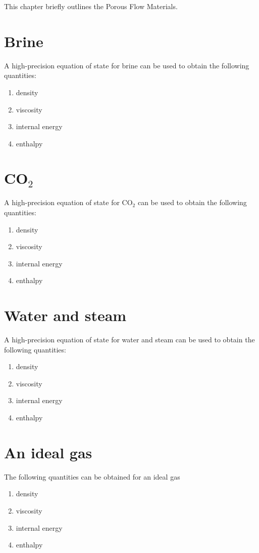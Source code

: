 \documentclass[12pt]{report}
\begin{document}
This chapter briefly outlines the Porous Flow Materials.

\section{Brine}

A high-precision equation of state for brine can be used to
obtain the following quantities:
\begin{enumerate}
\item density
\item viscosity
\item internal energy
\item enthalpy
\end{enumerate}


\section{CO$_{2}$}

A high-precision equation of state for CO$_{2}$ can be used to
obtain the following quantities:
\begin{enumerate}
\item density
\item viscosity
\item internal energy
\item enthalpy
\end{enumerate}

\section{Water and steam}
\label{water.and.steam.sec}
A high-precision equation of state for water and steam can be used to
obtain the following quantities:
\begin{enumerate}
\item density
\item viscosity
\item internal energy
\item enthalpy
\end{enumerate}

\section{An ideal gas}

The following quantities can be obtained for an ideal gas
\begin{enumerate}
\item density
\item viscosity
\item internal energy
\item enthalpy
\end{enumerate}
\end{document}

